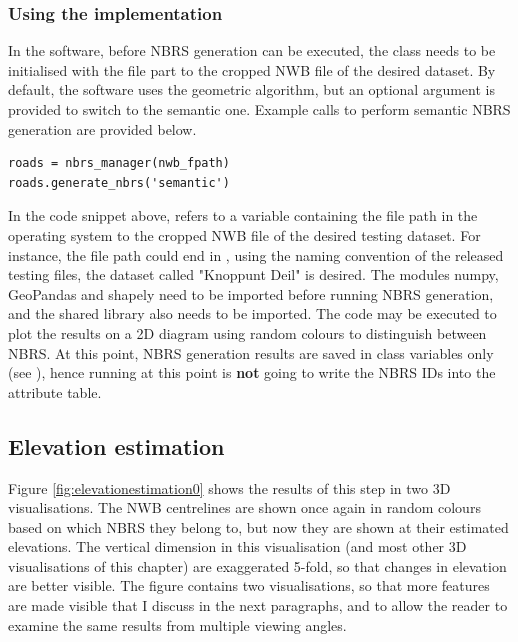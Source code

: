 \subsubsection{Using the implementation}

In the software, before NBRS generation can be executed, the  class needs to be initialised with the file part to the cropped NWB file of the desired dataset. By default, the software uses the geometric algorithm, but an optional argument is provided to switch to the semantic one. Example calls to perform semantic NBRS generation are provided below.

\begin{lstlisting}
roads = nbrs_manager(nwb_fpath)
roads.generate_nbrs('semantic')
\end{lstlisting}

In the code snippet above,  refers to a variable containing the file path in the operating system to the cropped NWB file of the desired testing dataset. For instance, the file path could end in , using the naming convention of the released testing files, the dataset called "Knoppunt Deil" is desired. The modules numpy, GeoPandas and shapely need to be imported before running NBRS generation, and the shared library  also needs to be imported. The code  may be executed to plot the results on a 2D diagram using random colours to distinguish between NBRS. At this point, NBRS generation results are saved in class variables only (see ), hence running  at this point is \textbf{not} going to write the NBRS IDs into the attribute table.

\subsection{Elevation estimation}
\label{sub:r_elevationestimation}

Figure \ref{fig:elevationestimation0} shows the results of this step in two 3D visualisations. The NWB centrelines are shown once again in random colours based on which NBRS they belong to, but now they are shown at their estimated elevations. The vertical dimension in this visualisation (and most other 3D visualisations of this chapter) are exaggerated 5-fold, so that changes in elevation are better visible. The figure contains two visualisations, so that more features are made visible that I discuss in the next paragraphs, and to allow the reader to examine the same results from multiple viewing angles.

